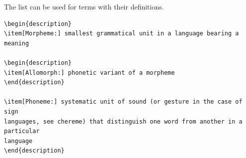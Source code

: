 \begin{frame}[fragile]

The  list can be used for terms with their definitions.

\begin{lstlisting}
\begin{description}
\item[Morpheme:] smallest grammatical unit in a language bearing a meaning

\begin{description}
\item[Allomorph:] phonetic variant of a morpheme 
\end{description}

\item[Phoneme:] systematic unit of sound (or gesture in the case of sign 
languages, see chereme) that distinguish one word from another in a particular 
language
\end{description}
\end{lstlisting}

%
%



\end{frame}


